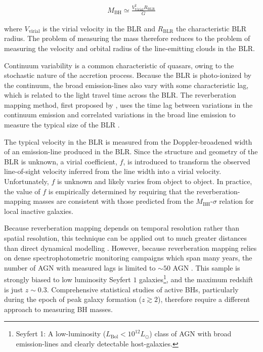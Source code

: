 \begingroup\makeatletter{}\check@mathfonts
\begin{eqnarray}
M_{\text{BH}} \simeq \frac{V_{\text{Virial}}^2R_{\text{BLR}}}{G}
\end{eqnarray}
\endgroup

\noindent where $V_{\text{virial}}$ is the virial velocity in the BLR and $R_{\text{BLR}}$ the characteristic BLR radius.
The problem of measuring the mass therefore reduces to the problem of measuring the velocity and orbital radius of the line-emitting clouds in the BLR.

Continuum variability is a common characteristic of quasars, owing to the stochastic nature of the accretion process.
Because the BLR is photo-ionized by the continuum, the broad emission-lines also vary with some characteristic lag, which is related to the light travel time across the BLR.
The reverberation mapping method, first proposed by \citet{blandford82a}, uses the time lag between variations in the continuum emission and correlated variations in the broad line emission to measure the typical size of the BLR \citep[e.g.][]{peterson93,netzer97,peterson14}.

The typical velocity in the BLR is measured from the Doppler-broadened width of an emission-line produced in the BLR.
Since the structure and geometry of the BLR is unknown, a virial coefficient, $f$, is introduced to transform the observed line-of-sight velocity inferred from the line width into a virial velocity.
Unfortunately, $f$ is unknown and likely varies from object to object.
In practice, the value of $f$ is empirically determined by requiring that the reverberation-mapping masses are consistent with those predicted from the $M_{\text{BH}}$-$\sigma$ relation for local inactive galaxies.

Because reverberation mapping depends on temporal resolution rather than spatial resolution, this technique can be applied out to much greater distances than direct dynamical modelling \citep[e.g.][]{kormendy13}.
However, because reverberation mapping relies on dense spectrophotometric monitoring campaigns which span many years, the number of AGN with measured lags is limited to $\sim50$ AGN \citep[e.g.][]{kaspi00,peterson04,kaspi07,bentz09,denney10,barth11,grier12}.
This sample is strongly biased to low luminosity Seyfert $1$ galaxies\footnote{Seyfert 1: A low-luminosity ($L_{\text{Bol}} < 10^{12}L_{\odot}$) class of AGN with broad emission-lines and clearly detectable host-galaxies.}, and the maximum redshift is just $z\sim0.3$.
Comprehensive statistical studies of active BHs, particularly during the epoch of peak galaxy formation ($z\gtrsim2$), therefore require a different approach to measuring BH masses.

